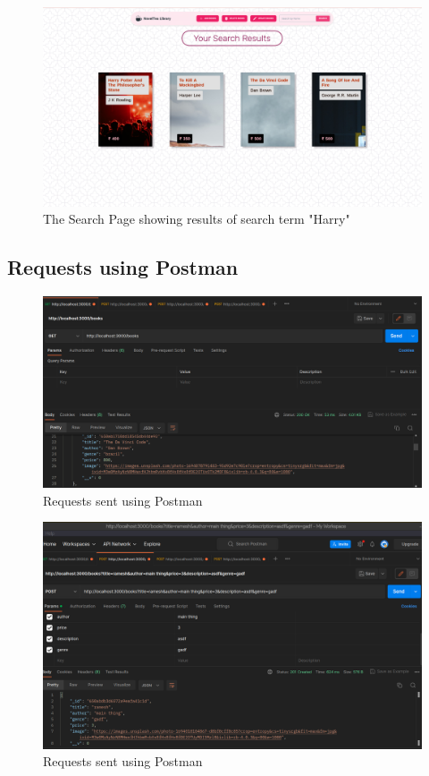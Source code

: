 \documentclass[11pt]{article}
\begin{document}
\begin{figure}[H]
    \centering
    \includegraphics[width=.95\textwidth]{screenshots/search.png}
    \caption{The Search Page showing results of search term "Harry"}
\end{figure}

\subsection{Requests using Postman}

\begin{figure}[H]
    \centering
    \includegraphics[width=.95\textwidth]{screenshots/postman 1.png}
    \caption{Requests sent using Postman}
\end{figure}

\begin{figure}[H]
    \centering
    \includegraphics[width=.95\textwidth]{screenshots/postman 2.png}
    \caption{Requests sent using Postman}
\end{figure}
\end{document}
